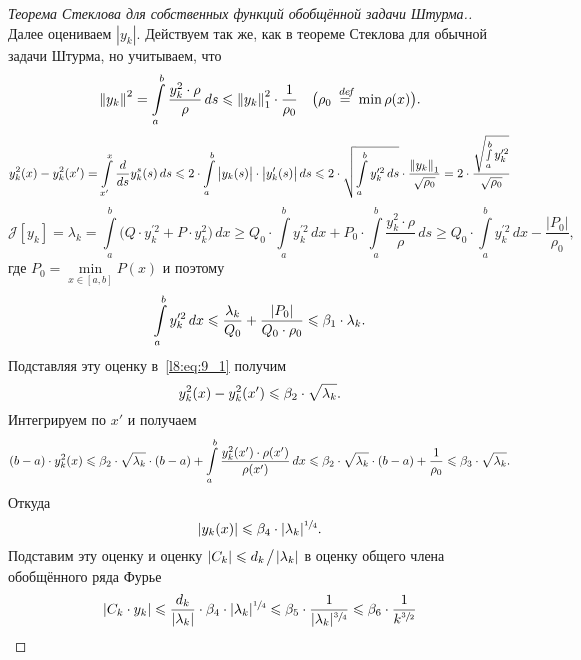 \documentclass[12pt,a4paper,openany,fleqn]{book}
\newcommand {\defeq}{\stackrel{\hspace{0.09 cm}de\!f}{=}}
\newcommand {\eqdef}{\defeq}
\newcommand{\J}{\ensuremath{\mathcal{J}}}
\newcommand{\der}[2]{\ensuremath{\frac{d#1}{d#2}}}
\newcommand{\norm}[1]{\ensuremath{\left\|#1\right\|}}
\theoremstyle{definition}
\begin{document}
\begin{proof}[Теорема Стеклова для собственных функций обобщённой задачи Штурма.]
		Далее оцениваем $|y_k|$. Действуем так же, как в теореме Стеклова для обычной задачи Штурма, но учитываем, что
		\begin{equation*}
			\hfill\norm{y_k}^2=\int\limits_a^b\frac{y_k^2\cdot\rho}{\rho}\,ds\leqslant\norm{y_k}^2_1\cdot\frac{1}{\rho_0}\quad\big(\rho_0\eqdef\min\rho(x)\big).\hfill
		\end{equation*}
		\begin{equation}
			\label{l8:eq:9_1}
			y^2_k(x)-y^2_k(x')=\int\limits_{x'}^{x}\der{}{s}y_k^s(s)\,ds\leqslant2\cdot\int\limits_a^b\big|y_k(s)\big|\cdot\big|y'_k(s)\big|\,ds\leqslant2\cdot\sqrt{\int\limits_a^b y_k^{\prime2}\,ds}\cdot\frac{\norm{y_k}_1}{\sqrt{\rho_0}}=2\cdot\frac{\sqrt{\smallint\limits_a^b y_k^{\prime2}}}{\sqrt{\rho_0}}
		\end{equation}
		\begin{equation*}
			\J[y_k]=\lambda_k=\int\limits_a^b\Big(Q\cdot y_k^{\prime2}+P\cdot y_k^2\Big)\,dx\geqslant Q_0\cdot\int\limits_a^b y_k^{\prime2}\,dx+P_0\cdot\int\limits_a^b\frac{y_k^2\cdot\rho}{\rho}\,ds\geqslant Q_0\cdot\int\limits_a^b y_k^{\prime2}\,dx-\frac{|P_0|}{\rho_0},
		\end{equation*}
		где $P_0=\min\limits_{x\in[a,b]}P(x)$ и поэтому 
		\begin{equation*}
			\hfill\int\limits_a^b y_k^{\prime2}\,dx\leqslant\frac{\lambda_k}{Q_0}+\frac{|P_0|}{Q_0\cdot\rho_0}\leqslant\beta_1\cdot\lambda_k.\hfill
		\end{equation*}
		Подставляя эту оценку в~\eqref{l8:eq:9_1} получим 
		\begin{equation*}
			\hfill y_k^2(x)-y_k^2(x')\leqslant\beta_2\cdot\sqrt{\lambda_k}.\hfill
		\end{equation*}
		Интегрируем по $x'$ и получаем 
		\begin{equation*}
			\hfill(b-a)\cdot y_k^2(x)\leqslant\beta_2\cdot\sqrt{\lambda_k}\cdot(b-a)+\int\limits_a^b\frac{y_k^2(x')\cdot\rho(x')}{\rho(x')}\,dx\leqslant\beta_2\cdot\sqrt{\lambda_k}\cdot(b-a)+\frac{1}{\rho_0}\leqslant\beta_3\cdot\sqrt{\lambda_k}.\hfill
		\end{equation*}
		Откуда
		\begin{equation*}
			\hfill|y_k(x)|\leqslant\beta_4\cdot|\lambda_k|^{\sfrac{1}{4}}.\hfill
		\end{equation*}
		Подставим эту оценку и оценку $|C_k|\leqslant d_k\!\bigm/\!|\lambda_k|$ в оценку общего члена обобщённого ряда Фурье
		\begin{equation*}
			\hfill|C_k\cdot y_k|\leqslant\frac{d_k}{|\lambda_k|}\cdot\beta_4\cdot|\lambda_k|^{\sfrac{1}{4}}\leqslant\beta_5\cdot\frac{1}{|\lambda_k|^{\sfrac{3}{4}}}\leqslant\beta_6\cdot\frac{1}{k^{\sfrac{3}{2}}}\hfill

\end{equation*}
\end{proof}
\end{document}
